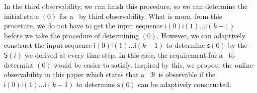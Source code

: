 In the third observability, we can finish this procedure, so we can determine the initial state \State$(0)$ for a \BCN\ by third observability. What is more, from this proceture, we do not have to get the input sequence $\mathsf{i}(0)\mathsf{i}(1)\ldots\mathsf{i}(k-1)$ before we take the procedure of determining \State$(0)$. However, we can adaptively construct the input sequence $\mathsf{i}(0)\mathsf{i}(1)\ldots\mathsf{i}(k-1)$ to determine $\mathsf{s}(0)$ by the $\mathsf{S}(t)$ we derived at every time step. In this case, the requirement for a \BCN\ to determint \State$(0)$ would be easier to satisfy. Inspired by this, we propose the online observability in this paper which states that a \BCN\ ${\mathcal{B}}$ is observable if the $\mathsf{i}(0)\mathsf{i}(1)\ldots\mathsf{i}(k-1)$ to determine $\mathsf{s}(0)$ can be adaptively constructed. 

